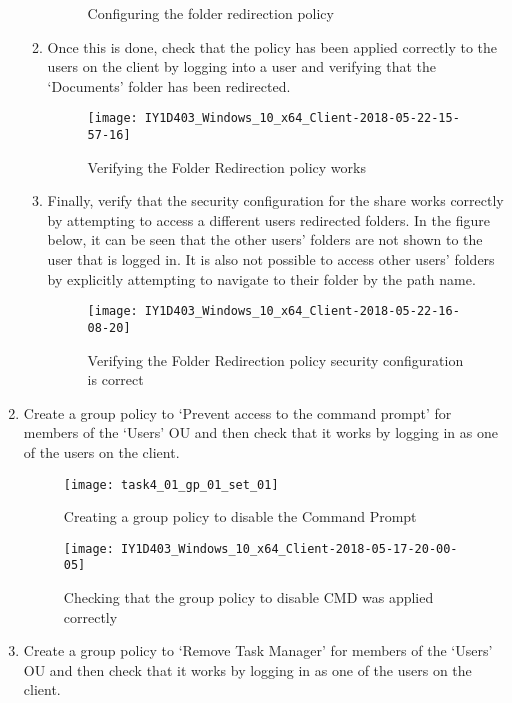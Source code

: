\begin{enumerate}[series=task4methodology1]
\begin{enumerate}[label=(\alph*)]
\begin{figure}[H]
          \caption{Configuring the folder redirection policy}
          \label{fig:task4:gp3a4}
        \end{figure}
      \item Once this is done, check that the policy has been applied correctly to the users on the client by logging into a user and verifying that the `Documents' folder has been redirected.
        \begin{figure}[H]
          \centering
          \captionsetup{skip=2pt}
          \texttt{[image: IY1D403\_Windows\_10\_x64\_Client-2018-05-22-15-57-16]}
          \caption{Verifying the Folder Redirection policy works}
          \label{fig:task4:gp3b1}
        \end{figure}
      \item Finally, verify that the security configuration for the share works correctly by attempting to access a different users redirected folders. In the figure below, it can be seen that the other users' folders are not shown to the user that is logged in. It is also not possible to access other users' folders by explicitly attempting to navigate to their folder by the path name.
        \begin{figure}[H]
          \centering
          \captionsetup{skip=2pt}
          \texttt{[image: IY1D403\_Windows\_10\_x64\_Client-2018-05-22-16-08-20]}
          \caption{Verifying the Folder Redirection policy security configuration is correct}
          \label{fig:task4:gp3b2}
        \end{figure}
    \end{enumerate}
  \item Create a group policy to `Prevent access to the command prompt' for members of the `Users' OU and then check that it works by logging in as one of the users on the client.
    \begin{figure}[H]
      \centering
      \captionsetup{skip=2pt}
      \texttt{[image: task4\_01\_gp\_01\_set\_01]}
      \caption{Creating a group policy to disable the Command Prompt}
      \label{fig:task4:gp1a}
    \end{figure}
    \begin{figure}[H]
      \centering
      \captionsetup{skip=2pt}
      \texttt{[image: IY1D403\_Windows\_10\_x64\_Client-2018-05-17-20-00-05]}
      \caption{Checking that the group policy to disable CMD was applied correctly}
      \label{fig:task4:gp1b}
    \end{figure}
  \item Create a group policy to `Remove Task Manager' for members of the `Users' OU and then check that it works by logging in as one of the users on the client.

\end{enumerate}

